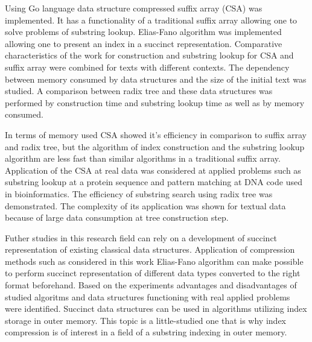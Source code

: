 
Using Go language data structure compressed suffix array (CSA) was implemented.
It has a functionality of a traditional suffix array allowing one to solve
problems of substring lookup. Elias-Fano algorithm was implemented allowing one
to present an index in a succinct representation. Comparative characteristics of
the work for construction and substring lookup for CSA and suffix array were combined
for texts with different contexts.
The dependency between memory consumed by data structures and the size of the initial text
was studied. A comparison between radix tree and these data structures was performed
by construction time and substring lookup time as well as by memory consumed.

In terms of memory used CSA showed it's efficiency in comparison to suffix array and radix tree,
but the algorithm of index construction and the substring lookup algorithm are less fast
than similar algorithms in a traditional suffix array. Application of the CSA at real data
was considered at applied problems such as substring lookup at a protein sequence and
pattern matching at DNA code used in bioinformatics.
The efficiency of substring search using radix tree was demonstrated. The complexity
of its application was shown for textual data because of large data consumption at tree construction step.

Futher studies in this research field can rely on a development of succinct representation of
existing classical data structures. Application of compression methods such as
considered in this work Elias-Fano algorithm can make possible to perform
succinct representation of different data types converted to the right format beforehand.
Based on the experiments advantages and disadvantages of studied algoritms and data structures
functioning with real applied problems were identified.
Succinct data structures can be used in algorithms utilizing index storage in outer memory.
This topic is a little-studied one that is why index compression is of interest in
a field of a substring indexing in outer memory.
